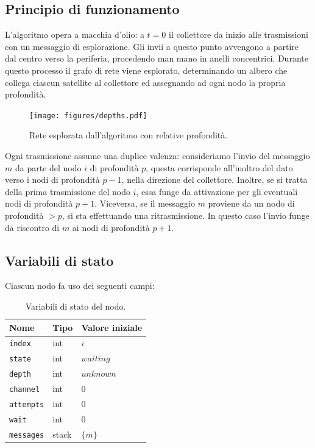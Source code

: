 \documentclass[a4paper,11pt]{article}
\theoremstyle{definition}
\begin{document}
\subsection{Principio di funzionamento}

L'algoritmo opera a macchia d'olio: a $t=0$ il collettore da inizio alle trasmissioni con un messaggio di esplorazione. Gli invii a questo punto avvengono a partire dal centro verso la periferia, procedendo man mano in anelli concentrici. Durante questo processo il grafo di rete viene esplorato, determinando un albero che collega ciascun satellite al collettore ed assegnando ad ogni nodo la propria profondità.

\begin{figure}[H]
\centering
\texttt{[image: figures/depths.pdf]}
\caption{Rete esplorata dall'algoritmo con relative profondità.}
\end{figure}

Ogni trasmissione assume una duplice valenza: consideriamo l'invio del messaggio $m$ da parte del nodo $i$ di profondità $p$, questa corrisponde all'inoltro del dato verso i nodi di profondità $p-1$, nella direzione del collettore. Inoltre, se si tratta della prima trasmissione del nodo $i$, essa funge da attivazione per gli eventuali nodi di profondità $p+1$. Viceversa, se il messaggio $m$ proviene da un nodo di profondità $> p$, si sta effettuando una ritrasmissione. In questo caso l'invio funge da riscontro di $m$ ai nodi di profondità $p+1$.

\subsection{Variabili di stato}

Ciascun nodo fa uso dei seguenti campi:

\begin{table}[H]
\centering
\begin{tabular}{| l | l | l |}
\multicolumn{1}{l}{Nome} &
\multicolumn{1}{l}{Tipo} &
\multicolumn{1}{l}{Valore iniziale} \\ \hline
\texttt{index} & int & $i$ \\ \hline
\texttt{state} & int & $waiting$ \\ \hline
\texttt{depth} & int & $unknown$ \\ \hline
\texttt{channel} & int & $0$ \\ \hline
\texttt{attempts} & int & $0$ \\ \hline
\texttt{wait} & int & $0$ \\ \hline
\texttt{messages} & stack & $\{m\}$ \\ \hline
\end{tabular}
\caption{Variabili di stato del nodo.}
\end{table}
\end{document}
